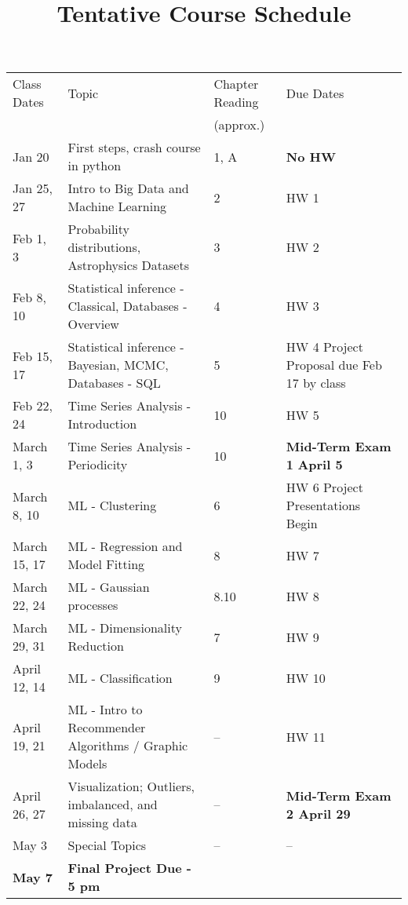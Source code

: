 \documentclass[12pt]{article}
\begin{document}
\begin{table}[h]
\small
\title{\bf \Large Tentative Course Schedule}
\centering
\begin{tabular}{|p{25mm}|p{70mm}|p{15mm}|p{35mm}|}
\hline
Class Dates & Topic & Chapter Reading  & Due Dates \\
 &  & (approx.)  & \\
\hline
Jan 20 & First steps, crash course in python & 1, A & {\bf No HW} \\
\hline
Jan 25, 27 & Intro to Big Data and Machine Learning & 2 & HW 1 \\
 \hline
Feb 1, 3 & Probability distributions, Astrophysics Datasets  &  3  & HW 2 \\
 \hline
Feb 8, 10 & Statistical inference - Classical, Databases - Overview  &  4  & HW 3  \\
\hline
Feb 15, 17 & Statistical inference -Bayesian,  MCMC, Databases - SQL   &  5  & HW 4 \newline Project Proposal due Feb 17 by class \\
 \hline
Feb 22, 24 & Time Series Analysis - Introduction & 10  & HW 5 \\
 \hline
March 1, 3 & Time Series Analysis - Periodicity & 10  & {\bf Mid-Term Exam 1} {\bf April 5}  \\
 \hline
March 8, 10 & ML - Clustering & 6 & HW 6 \newline Project Presentations Begin \\
 \hline
March 15, 17 & ML - Regression and Model Fitting & 8 & HW 7  \\ 
 \hline
 March 22, 24 & ML - Gaussian processes  & 8.10 & HW 8 \\ 
 \hline
 March 29, 31 & ML - Dimensionality Reduction & 7 & HW 9 \\
 \hline 
April 12, 14 & ML - Classification & 9 & HW 10 \\
 \hline
April 19, 21 & ML - Intro to Recommender Algorithms / Graphic Models  & -- & HW 11 \\
 \hline
 April 26, 27 & Visualization; Outliers, imbalanced, and missing data  & -- & \bf Mid-Term Exam 2 {\bf April 29} \\
 \hline
May 3 & Special Topics & -- & -- \\
 \hline
{\bf May 7} & {\bf Final Project Due - 5 pm} & & ~\\ 
\hline
\end{tabular}
\label{tab:chisq}
\end{table}
\clearpage
\end{document}
